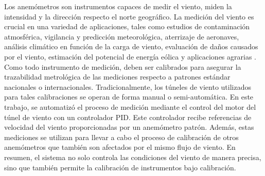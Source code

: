 Los anemómetros son instrumentos capaces de medir el viento, miden la intensidad y la dirección respecto el norte geográfico. La medición del viento es crucial en una variedad de aplicaciones, tales como estudios de contaminación atmosférica, vigilancia y predicción meteorológica, aterrizaje de aeronaves, análisis climático en función de la carga de viento, evaluación de daños causados por el viento, estimación del potencial de energía eólica y aplicaciones agrarias \cite{wmoChapter8}. Como todo instrumento de medición, deben ser calibrados para asegurar la trazabilidad metrológica de las mediciones respecto a patrones estándar nacionales o internacionales. Tradicionalmente, los túneles de viento utilizados para tales calibraciones se operan de forma manual o semi-automática. En este trabajo, se automatizó el proceso de medición mediante el control del motor del túnel de viento con un controlador PID. Este controlador recibe referencias de velocidad del viento proporcionadas por un anemómetro patrón. Además, estas mediciones se utilizan para llevar a cabo el proceso de calibración de otros anemómetros que también son afectados por el mismo flujo de viento. En resumen, el sistema no solo controla las condiciones del viento de manera precisa, sino que también permite la calibración de instrumentos bajo calibración.

